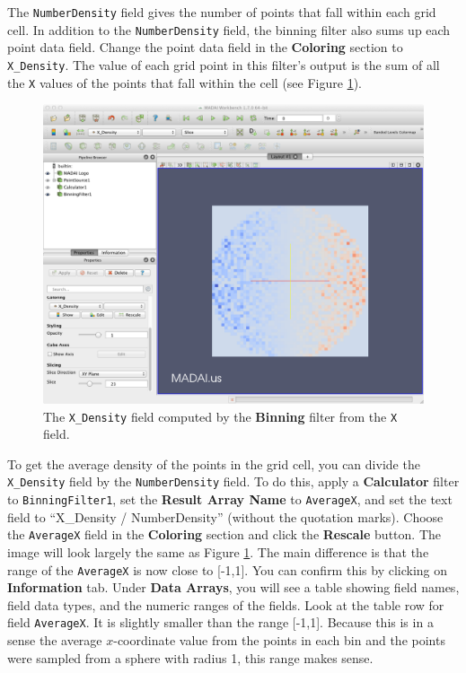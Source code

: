 \documentclass[12pt]{article}
\newcommand{\filter}[1]{\textbf{#1}}
\newcommand{\filterinstance}[1]{\texttt{#1}}
\newcommand{\setting}[1]{\textbf{#1}}
\newcommand{\field}[1]{\texttt{#1}}
\begin{document}
The \field{NumberDensity} field gives the number of points that fall within each grid cell. In addition to the \field{NumberDensity} field, the binning filter also sums up each point data field. Change the point data field in the \setting{Coloring} section to \field{X\_Density}. The value of each grid point in this filter's output is the sum of all the \field{X} values of the points that fall within the cell (see Figure \ref{fig:BinningFilterXDensity}).

\begin{figure}[htbp]
   \centering
   \includegraphics[scale=.25]{images/BinningFilter_XDensity.png} %
   \caption{The \texttt{X\_Density} field computed by the \textbf{Binning} filter from the \texttt{X} field.}
   \label{fig:BinningFilterXDensity}
\end{figure}

To get the average density of the points in the grid cell, you can divide the \field{X\_Density} field by the \field{NumberDensity} field. To do this, apply a \filter{Calculator} filter to \filterinstance{BinningFilter1}, set the \setting{Result Array Name} to \field{AverageX}, and set the text field to ``X\_Density / NumberDensity'' (without the quotation marks).  Choose the \field{AverageX} field in the \setting{Coloring} section and click the \setting{Rescale} button. The image will look largely the same as Figure \ref{fig:BinningFilterXDensity}. The main difference is that the range of the \field{AverageX} is now close to [-1,1]. You can confirm this by clicking on \textbf{Information} tab. Under \setting{Data Arrays}, you will see a table showing field names, field data types, and the numeric ranges of the fields. Look at the table row for field \field{AverageX}. It is slightly smaller than the range [-1,1]. Because this is in a sense the average $x$-coordinate value from the points in each bin and the points were sampled from a sphere with radius 1, this range makes sense. 
\end{document}
